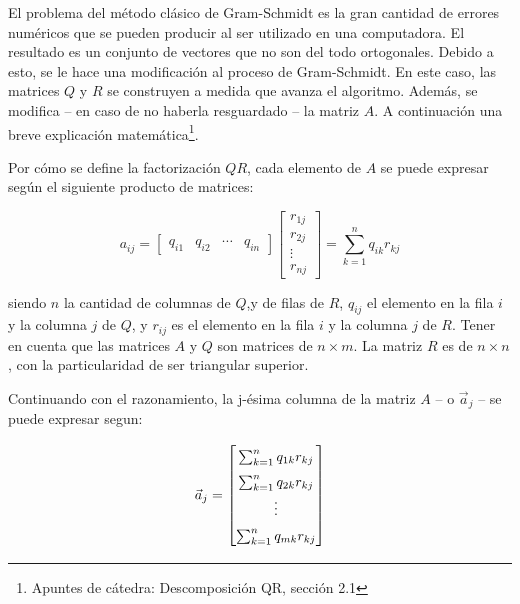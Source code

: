 \documentclass[spanish]{article}
\begin{document}
        
            \par El problema del método clásico de Gram-Schmidt es la gran cantidad de errores numéricos que se pueden producir al ser utilizado en una computadora. El resultado es un conjunto de vectores que no son del todo ortogonales. Debido a esto, se le hace una modificación al proceso de Gram-Schmidt. En este caso, las matrices $Q$ y $R$ se construyen a medida que avanza el algoritmo. Además, se modifica – en caso de no haberla resguardado – la matriz $A$. A continuación una breve explicación matemática\footnote{Apuntes de cátedra: Descomposición QR, sección 2.1}.
            
            \par Por cómo se define la factorización $QR$, cada elemento de $A$ se puede expresar según el siguiente producto de matrices:
            
            \begin{equation}
                a_{ij} = 
                    \begin{bmatrix}
                            q_{i 1} & q_{i 2} & \cdots & q_{i n}
                    \end{bmatrix}
                    \begin{bmatrix}
                        r_{1 j}\\
                        r_{2 j}\\
                        \vdots\\
                        r_{n j}
                    \end{bmatrix}
                    = \sum_{k = 1}^{n} q_{i k} r_{k j}
            \end{equation}
            
            siendo $n$ la cantidad de columnas de $Q$,y de filas de $R$, $q_{i j}$ el elemento en la fila $i$ y la columna $j$ de $Q$, y $r_{i j}$ es el elemento en la fila $i$ y la columna $j$ de $R$. Tener en cuenta que las matrices $A$ y $Q$ son matrices de $n\times m$. La matriz $R$ es de $n\times n$, con la particularidad de ser triangular superior.
            \par Continuando con el razonamiento, la j-ésima columna de la matriz $A$ – o $\vec{a}_{j}$ – se puede expresar segun:
            
            \begin{equation}
                \vec{a}_{j} =
                \arraycolsep=1.4pt\def\arraystretch{1.5}
                \begin{bmatrix}
                        
                        \sum_{k = 1}^{n} q_{1 k} r_{k j}\\
                        \sum_{k = 1}^{n} q_{2 k} r_{k j}\\
                        \vdots\\
                        \sum_{k = 1}^{n} q_{m k} r_{k j}\\
                    \end{bmatrix}
            \end{equation}
            
\end{document}
